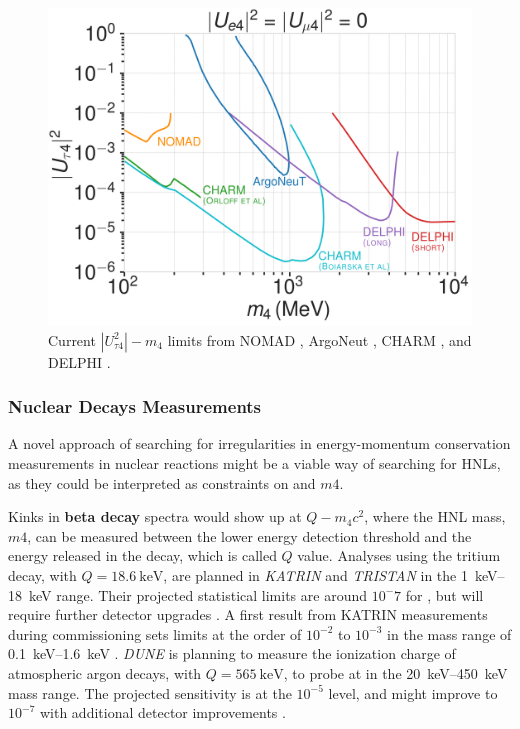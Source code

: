 \begin{figure}
  \includegraphics{figures/hnl_simulation/theory/UtauN_custom_plots_LF_grid_white.png}
  \caption[Current $|U_{\tau4}^2|-m_4$ limits]{Current $|U_{\tau4}^2|-m_4$ limits from NOMAD \cite{NOMAD:2001eyx}, ArgoNeut \cite{ArgoNeuT:2021clc}, CHARM \cite{Orloff:2002de, Boiarska:2021yho}, and DELPHI \cite{DELPHI:1996qcc}.}
\end{figure}

\subsubsection{Nuclear Decays Measurements}

A novel approach of searching for irregularities in energy-momentum conservation measurements in nuclear reactions might be a viable way of searching for HNLs, as they could be interpreted as constraints on  and $m4$.

Kinks in \textbf{beta decay} spectra would show up at $Q-m_4c^2$, where the HNL mass, $m4$, can be measured between the lower energy detection threshold and the energy released in the decay, which is called $Q$ value. Analyses using the tritium decay, with $Q=\SI{18.6}{\kilo\electronvolt}$, are planned in \textit{KATRIN}  and \textit{TRISTAN}  in the \SIrange{1}{18}{\kilo\electronvolt} range. Their projected statistical limits are around $10^-7$ for , but will require further detector upgrades \cite{Mertens_2019}. A first result from KATRIN measurements during commissioning sets limits at the order of $10^{-2}$ to $10^{-3}$ in the mass range of \SIrange{0.1}{1.6}{\kilo\electronvolt} . \textit{DUNE} is planning to measure the ionization charge of atmospheric argon decays, with $Q=\SI{565}{\kilo\electronvolt}$, to probe  at in the \SIrange{20}{450}{\kilo\electronvolt} mass range. The projected sensitivity is at the $10^{-5}$ level, and might improve to $10^{-7}$ with additional detector improvements .

